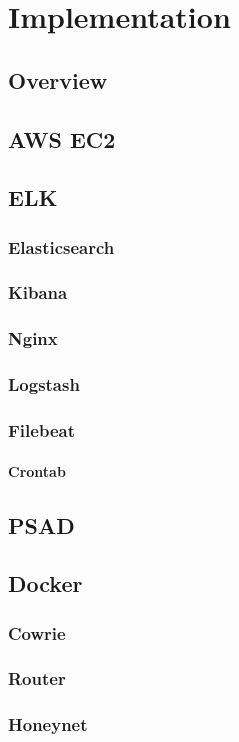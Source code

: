 \chapter{Implementation}



\section{Overview}



\section{AWS EC2}


\section{ELK}
	\subsection{Elasticsearch}
	\subsection{Kibana}
	\subsection{Nginx}
	\subsection{Logstash}
	\subsection{Filebeat}
		\subsubsection{Crontab}

\section{PSAD}

\section{Docker}
	\subsection{Cowrie}
	\subsection{Router}
	\subsection{Honeynet}
